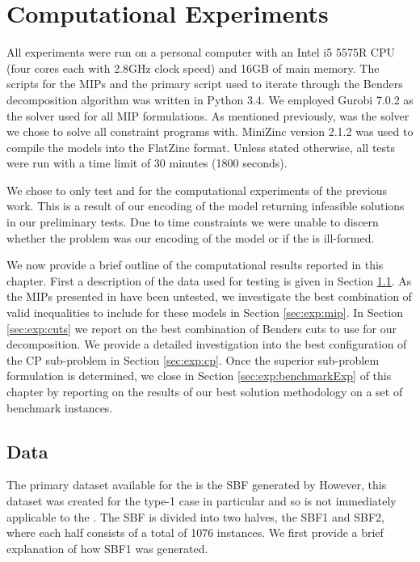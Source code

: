 
\chapter{Computational Experiments}
\label{chap:exp}

All experiments were run on a personal computer with
an Intel i5 5575R CPU (four cores each with 2.8GHz clock speed) and 16GB of main memory.
The scripts for the MIPs and the primary script used 
to iterate through the Benders
decomposition algorithm was written in Python 3.4.
We employed Gurobi 7.0.2 as the solver
used for all MIP formulations.
As mentioned previously, \chuffed was the solver
we chose to solve all constraint programs with.
MiniZinc version 2.1.2 was used to compile the models
into the \chuffed FlatZinc format.
Unless stated otherwise, all tests were run
with a time limit of 30 minutes (1800 seconds).

We chose to only test  and  for the
computational experiments of the previous work.
This is a result of our encoding of the  model
returning infeasible solutions in our preliminary tests.
Due to time constraints we were unable to discern whether
the problem was our encoding of the model
or if the  is ill-formed.

We now provide a brief outline of the computational
results reported in this chapter.
First a description of the data used for testing
is given in Section \ref{sec:exp:data}.
As the MIPs presented in 
have been untested, we investigate the best combination
of valid inequalities to include for these models
in Section \ref{sec:exp:mip}.
In Section \ref{sec:exp:cuts} we report on the best combination
of Benders cuts to use for our decomposition.
We provide a detailed investigation into the best configuration
of the CP sub-problem in Section \ref{sec:exp:cp}.
Once the superior sub-problem formulation is determined, 
we close in Section \ref{sec:exp:benchmarkExp} of
this chapter by reporting on the results of our best
solution methodology on a set of benchmark instances.

\section{Data}
\label{sec:exp:data}
The primary dataset available for the \sua{} is
the SBF generated by \citeauthor{Scholl2013}
However, this dataset was created for the type-1 case in
particular and so is not immediately applicable to
the .
The SBF is divided into two halves, the SBF1 and SBF2, 
where each half consists of a total of 1076 instances.
We first provide a brief explanation of how SBF1
was generated.

